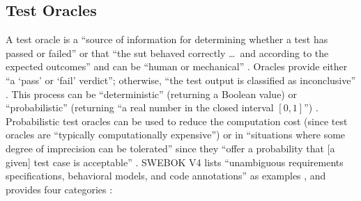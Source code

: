 \subsection{Test Oracles}
A test oracle is a ``source of information for determining whether a test has
passed or failed'' \citep[p.~13]{IEEE2022} or that ``the \acs{sut} behaved
correctly \dots\ and according to the expected outcomes'' and can be ``human or
mechanical'' \citep[p.~5-5]{SWEBOK2024}. Oracles provide either ``a
`pass' or `fail' verdict''; otherwise, ``the test output is classified as
inconclusive'' \citep[p.~5-5]{SWEBOK2024}. This process can be ``deterministic''
(returning a Boolean value) or ``probabilistic'' (returning ``a real number in
the closed interval $[0, 1]$'') \citep[p.~509]{BarrEtAl2015}. Probabilistic
test oracles can be used to reduce the computation cost (since test oracles
are ``typically computationally expensive'') \citep[p.~509]{BarrEtAl2015}
or in ``situations where some degree of imprecision can be tolerated'' since
they ``offer a probability that [a given] test case is acceptable''
\citep[p.~510]{BarrEtAl2015}. SWEBOK V4 lists ``unambiguous requirements
specifications, behavioral models, and code annotations'' as examples
\citep[p.~5-5]{SWEBOK2024}, and \citeauthor{BarrEtAl2015} provides four
categories \citeyearpar[p.~510]{BarrEtAl2015}:


